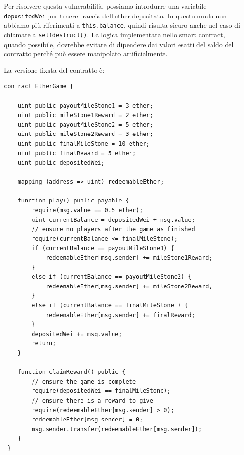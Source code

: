 Per risolvere questa vulnerabilità, possiamo introdurre una variabile \texttt{depositedWei} per tenere traccia dell'ether depositato. In questo modo non abbiamo più riferimenti a \texttt{this.balance}, quindi risulta sicuro anche nel caso di chiamate a \texttt{selfdestruct()}. La logica implementata nello smart contract, quando possibile, dovrebbe evitare di dipendere dai valori esatti del saldo del contratto perché può essere manipolato artificialmente.

La versione fixata del contratto è:

\begin{lstlisting}[language=Solidity]
contract EtherGame {
    
    uint public payoutMileStone1 = 3 ether;
    uint public mileStone1Reward = 2 ether;
    uint public payoutMileStone2 = 5 ether;
    uint public mileStone2Reward = 3 ether; 
    uint public finalMileStone = 10 ether; 
    uint public finalReward = 5 ether; 
    uint public depositedWei;
    
    mapping (address => uint) redeemableEther;
    
    function play() public payable {
        require(msg.value == 0.5 ether);
        uint currentBalance = depositedWei + msg.value;
        // ensure no players after the game as finished
        require(currentBalance <= finalMileStone);
        if (currentBalance == payoutMileStone1) {
            redeemableEther[msg.sender] += mileStone1Reward;
        }
        else if (currentBalance == payoutMileStone2) {
            redeemableEther[msg.sender] += mileStone2Reward;
        }
        else if (currentBalance == finalMileStone ) {
            redeemableEther[msg.sender] += finalReward;
        }
        depositedWei += msg.value;
        return;
    }
    
    function claimReward() public {
        // ensure the game is complete
        require(depositedWei == finalMileStone);
        // ensure there is a reward to give
        require(redeemableEther[msg.sender] > 0); 
        redeemableEther[msg.sender] = 0;
        msg.sender.transfer(redeemableEther[msg.sender]);
    }
 }
\end{lstlisting}

